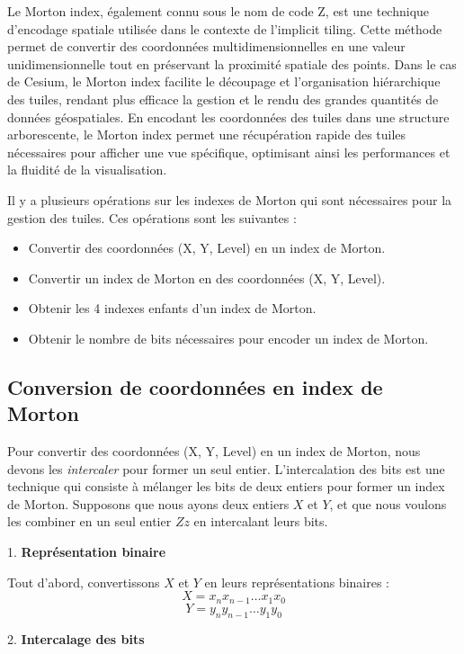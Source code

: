 Le Morton index, également connu sous le nom de code Z, est une technique d'encodage spatiale utilisée dans le contexte de l'implicit tiling. Cette méthode permet de convertir des coordonnées multidimensionnelles en une valeur unidimensionnelle tout en préservant la proximité spatiale des points. Dans le cas de Cesium, le Morton index facilite le découpage et l'organisation hiérarchique des tuiles, rendant plus efficace la gestion et le rendu des grandes quantités de données géospatiales. En encodant les coordonnées des tuiles dans une structure arborescente, le Morton index permet une récupération rapide des tuiles nécessaires pour afficher une vue spécifique, optimisant ainsi les performances et la fluidité de la visualisation.

Il y a plusieurs opérations sur les indexes de Morton qui sont nécessaires pour la gestion des tuiles. Ces opérations sont les suivantes :

\begin{itemize}
    \item Convertir des coordonnées (X, Y, Level) en un index de Morton.
    \item Convertir un index de Morton en des coordonnées (X, Y, Level).
    \item Obtenir les 4 indexes enfants d'un index de Morton.
    \item Obtenir le nombre de bits nécessaires pour encoder un index de Morton.
\end{itemize}

\subsection*{Conversion de coordonnées en index de Morton}

Pour convertir des coordonnées (X, Y, Level) en un index de Morton, nous devons les \textit{intercaler} pour former un seul entier. L'intercalation des bits est une technique qui consiste à mélanger les bits de deux entiers pour former un index de Morton. Supposons que nous ayons deux entiers \( X \) et \( Y \), et que nous voulons les combiner en un seul entier \( Zz \) en intercalant leurs bits.

1. \textbf{Représentation binaire}

   Tout d'abord, convertissons \( X \) et \( Y \) en leurs représentations binaires :
   \[
   X = x_n x_{n-1} \ldots x_1 x_0
   \]
   \[
   Y = y_n y_{n-1} \ldots y_1 y_0
   \]

2. \textbf{Intercalage des bits}

